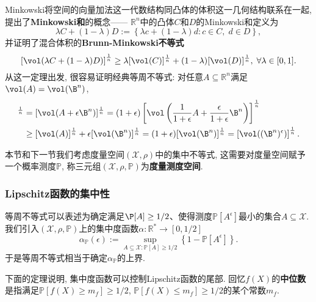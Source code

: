 Minkowski将空间的向量加法这一代数结构同凸体的体积这一几何结构联系在一起, 提出了\textbf{Minkowski和}的概念——
$\mathbb{R}^n$中的凸体$C$和$D$的Minkowski和定义为
\begin{equation*}
	\lambda C + (1 - \lambda) D := \left\{ \lambda c + (1 - \lambda) d \colon c \in C,\; d \in D \right\}, 
\end{equation*}
并证明了混合体积的\textbf{Brunn-Minkowski不等式}
\begin{equation*}
	\left[ \vol(\lambda C + (1-\lambda) D)  \right]^{\frac1n}
	\geq \lambda [\vol(C)]^{\frac1n} + (1-\lambda) [\vol(D)]^{\frac1n},\;
	\forall \lambda \in [0,1]. 
\end{equation*}
从这一定理出发, 很容易证明经典等周不等式: 对任意$A \subseteq \mathbb{R}^n$满足$\vol(A) = \vol(\B^n)$, 
\begin{align*}
	[\vol(A^{\epsilon})]^{\frac1n}
	&= [\vol(A + \epsilon \B^n)]^{\frac1n}
	= (1+\epsilon) \left[\vol\left(\frac{1}{1+\epsilon} A + \frac{\epsilon}{1+\epsilon} \B^n\right)\right]^{\frac1n} \\
	&\geq [\vol(A)]^{\frac1n} + \epsilon [\vol(\B^n)]^{\frac1n} 
	= (1+\epsilon) [\vol(\B^n)]^{\frac1n} 
	= \left[ \vol((\B^n)^{\epsilon}) \right]^{\frac1n}. 
\end{align*}


本节和下一节我们考虑度量空间$(\mathcal{X}, \rho)$中的集中不等式, 这需要对度量空间赋予一个概率测度$\mathbb{P}$, 称三元组$(\mathcal{X}, \rho, \mathbb{P})$为\textbf{度量测度空间}. 

\subsubsection{Lipschitz函数的集中性}

等周不等式可以表述为确定满足$\P[A] \geq 1/2$、使得测度$\mathbb{P}[A^{\epsilon}]$最小的集合$A \subseteq \mathcal{X}$.
我们引入$(\mathcal{X}, \rho, \mathbb{P})$上的集中度函数$\alpha \colon \mathbb{R}^* \to [0, 1/2]$
\begin{equation*}
	\alpha_{\mathbb{P}}(\epsilon)
	:= \sup_{A \subseteq \mathcal{X} \colon \mathbb{P}[A] \geq 1/2} \left\{ 1 - \mathbb{P}[A^{\epsilon}] \right\}. 
\end{equation*}
于是等周不等式相当于确定$\alpha_{\mathbb{P}}$的上界. 

下面的定理说明, 集中度函数可以控制Lipschitz函数的尾部. 
回忆$f(X)$的\textbf{中位数}是指满足$\mathbb{P}[f(X) \geq m_f] \geq 1/2$, $\mathbb{P}[f(X) \leq m_f] \geq 1/2$的某个常数$m_f$. 

